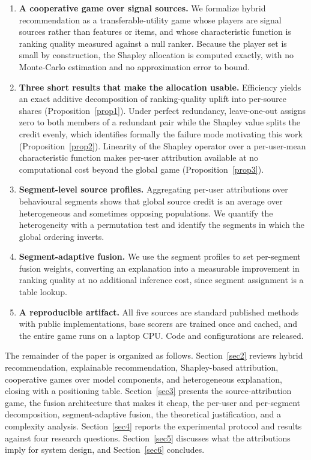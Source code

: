 \documentclass[pdflatex,sn-mathphys-num]{sn-jnl}%
\theoremstyle{thmstyleone}%
\theoremstyle{thmstyletwo}%
\theoremstyle{thmstylethree}%
\begin{document}
\begin{enumerate}
\item \textbf{A cooperative game over signal sources.} We formalize hybrid recommendation as a transferable-utility game whose players are signal sources rather than features or items, and whose characteristic function is ranking quality measured against a null ranker. Because the player set is small by construction, the Shapley allocation is computed exactly, with no Monte-Carlo estimation and no approximation error to bound.

\item \textbf{Three short results that make the allocation usable.} Efficiency yields an exact additive decomposition of ranking-quality uplift into per-source shares (Proposition~\ref{prop1}). Under perfect redundancy, leave-one-out assigns zero to both members of a redundant pair while the Shapley value splits the credit evenly, which identifies formally the failure mode motivating this work (Proposition~\ref{prop2}). Linearity of the Shapley operator over a per-user-mean characteristic function makes per-user attribution available at no computational cost beyond the global game (Proposition~\ref{prop3}).

\item \textbf{Segment-level source profiles.} Aggregating per-user attributions over behavioural segments shows that global source credit is an average over heterogeneous and sometimes opposing populations. We quantify the heterogeneity with a permutation test and identify the segments in which the global ordering inverts.

\item \textbf{Segment-adaptive fusion.} We use the segment profiles to set per-segment fusion weights, converting an explanation into a measurable improvement in ranking quality at no additional inference cost, since segment assignment is a table lookup.

\item \textbf{A reproducible artifact.} All five sources are standard published methods with public implementations, base scorers are trained once and cached, and the entire game runs on a laptop CPU. Code and configurations are released.
\end{enumerate}

The remainder of the paper is organized as follows. Section~\ref{sec2} reviews hybrid recommendation, explainable recommendation, Shapley-based attribution, cooperative games over model components, and heterogeneous explanation, closing with a positioning table. Section~\ref{sec3} presents the source-attribution game, the fusion architecture that makes it cheap, the per-user and per-segment decomposition, segment-adaptive fusion, the theoretical justification, and a complexity analysis. Section~\ref{sec4} reports the experimental protocol and results against four research questions. Section~\ref{sec5} discusses what the attributions imply for system design, and Section~\ref{sec6} concludes.
\end{document}
